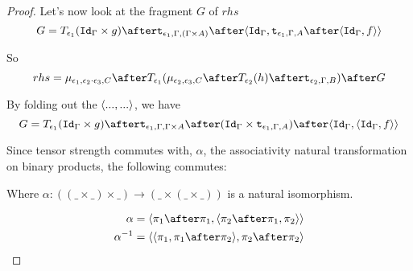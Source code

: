 \documentclass{report}
\begin{document}
\begin{framed}
\begin{proof}
        Let's now look at the fragment $G$ of $rhs$
        \begin{equation}
            G = \T{\e_1}{(\idg\times g)}\after\tstrength{\e_1}{\G}{(\G\times A)}\after\pr{\idg}{\tstrength{\e_1}{\G}{A}\after\pr{\idg}{f}}
        \end{equation}
        
        So
        \begin{equation}
            rhs = \bind{\e_1}{\e_2\dot\e_3}{C}\after\T{\e_1}{(\bind{\e_2}{\e_3}{C}\after \T{\e_2}{(h)} \after \tstrength{\e_2}{\G}{B})}\after G
        \end{equation}
        
        
        By folding out the $\langle..., ...\rangle$, we have
        \begin{equation}
            G = \T{\e_1}{(\idg\times g)}\after\tstrength{\e_1}{\G}{\G \times A}\after(\idg\times\tstrength{\e_1}{\G}{A})\after\pr{\idg}{\pr{\idg}{f}}
        \end{equation}
        
        Since tensor strength commutes with, $\alpha$, the associativity natural transformation on binary products, the following commutes:


        {
            \centering
        }
        
        
        Where $\alpha: ((\_ \times \_) \times \_) \rightarrow (\_ \times (\_ \times \_))$ is a natural isomorphism.
        
        \begin{align*}
            \alpha & = \pr{\p\after\p}{\pr{\pp\after\p}{\pp}}\\
            \alpha^{-1} &= \pr{\pr{\p}{\p\after\pp}}{\pp\after\pp}
        \end{align*}
        

\end{proof}
\end{framed}
\end{document}
